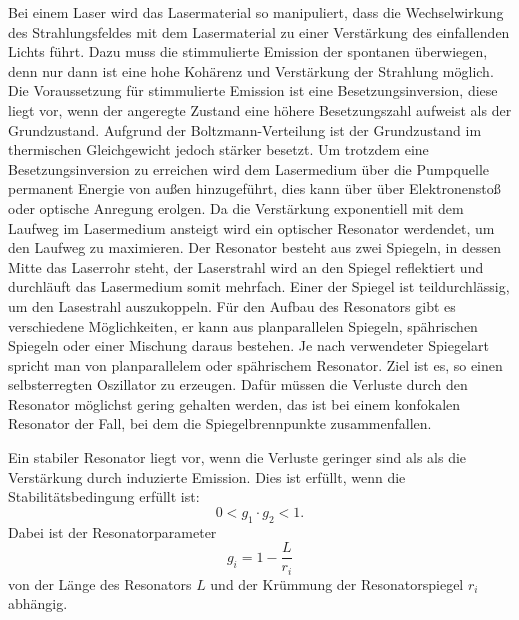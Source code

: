 Bei einem Laser wird das Lasermaterial so manipuliert, dass die Wechselwirkung des Strahlungsfeldes
mit dem Lasermaterial zu einer Verstärkung des einfallenden Lichts führt. Dazu muss die stimmulierte
Emission der spontanen überwiegen, denn nur dann ist eine hohe Kohärenz und Verstärkung der Strahlung möglich.
Die Voraussetzung für stimmulierte Emission ist eine Besetzungsinversion, diese liegt vor, wenn der angeregte Zustand
eine höhere Besetzungszahl aufweist als der Grundzustand. Aufgrund der Boltzmann-Verteilung ist der Grundzustand im
thermischen Gleichgewicht jedoch stärker besetzt. Um trotzdem eine Besetzungsinversion zu erreichen wird dem
Lasermedium über die Pumpquelle permanent Energie von außen hinzugeführt, dies kann über über Elektronenstoß
oder optische Anregung erolgen.
Da die Verstärkung exponentiell mit dem Laufweg im Lasermedium ansteigt wird ein optischer Resonator werdendet, um den
Laufweg zu maximieren. Der Resonator besteht aus zwei Spiegeln, in dessen Mitte das Laserrohr steht, der Laserstrahl wird an
den Spiegel reflektiert und durchläuft das Lasermedium somit mehrfach. Einer der Spiegel ist teildurchlässig, um den Lasestrahl
auszukoppeln. Für den Aufbau des Resonators gibt es verschiedene Möglichkeiten, er kann aus planparallelen Spiegeln, spährischen
Spiegeln oder einer Mischung daraus bestehen. Je nach verwendeter Spiegelart spricht man von planparallelem oder spährischem
Resonator. Ziel ist es, so einen selbsterregten Oszillator zu erzeugen. Dafür müssen die Verluste durch den Resonator möglichst gering
gehalten werden, das ist bei einem konfokalen Resonator der Fall, bei dem die Spiegelbrennpunkte zusammenfallen.

Ein stabiler Resonator liegt vor, wenn die Verluste geringer sind als als die Verstärkung durch induzierte Emission.
Dies ist erfüllt, wenn die Stabilitätsbedingung erfüllt ist:
\begin{equation}
  0< g_1 \cdot g_2 <1.
\end{equation}
Dabei ist der Resonatorparameter
\begin{equation}
  g_i = 1- \frac{L}{r_i}
\end{equation}
von der Länge des Resonators $L$ und der Krümmung der Resonatorspiegel $r_i$ abhängig.

